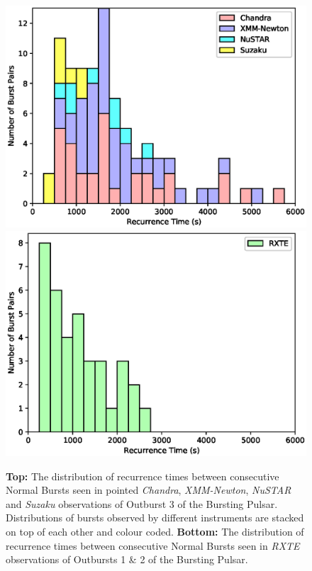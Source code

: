 \begin{figure}
  \centering
  \includegraphics[width=.9\linewidth, trim={0.4cm 0 1.1cm 0},clip]{images/manyinst_stdist.eps}
    \includegraphics[width=.9\linewidth, trim={0.4cm 0 1.1cm 0},clip]{images/rinst_stdist.eps}
  \caption{\small \textbf{Top:} The distribution of recurrence times between consecutive Normal Bursts seen in pointed \textit{Chandra}, \textit{XMM-Newton}, \textit{NuSTAR} and \textit{Suzaku} observations of Outburst 3 of the Bursting Pulsar.  Distributions of bursts observed by different instruments are stacked on top of each other and colour coded. \textbf{Bottom:} The distribution of recurrence times between consecutive Normal Bursts seen in \textit{RXTE} observations of Outbursts 1 \& 2 of the Bursting Pulsar.}
  \label{fig:sep}
\end{figure}

